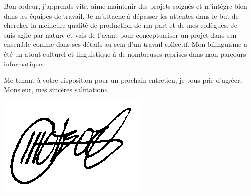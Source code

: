 \documentclass[12pt,a4paper]{article}
\begin{document}
Bon codeur, j'apprends vite, aime maintenir des projets
soignés et m'intègre bien dans les équipes de travail.
Je m'attache à dépasser les attentes dans le but de chercher
la meilleure qualité de production de ma part et de mes collègues.
Je suis agile par nature et vais de l'avant pour conceptualiser un projet
dans son ensemble comme dans ses détails au sein d'un travail collectif.
Mon bilinguisme a été un atout culturel et linguistique à de nombreuses
reprises dans mon parcours informatique.



Me tenant à votre disposition pour un prochain entretien,
je vous prie d'agréer, Monsieur,
mes sincères salutations.

\vspace*{\fill}

{
    \hspace*{\fill}
    \begin{minipage}{.4\textwidth}
        \includegraphics[width=.45\textwidth]{sig.png}
    \end{minipage}
}
\end{document}

